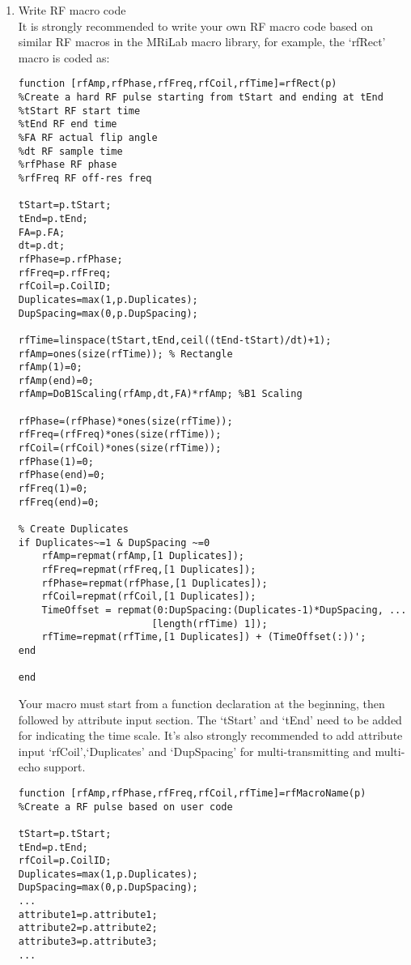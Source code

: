 \documentclass{book}%
\begin{document}
\begin{enumerate}

\item Write RF macro code \\

It is strongly recommended to write your own RF macro code based on similar RF macros in the MRiLab macro library, for example, the `rfRect' macro is coded as:

\begin{verbatim}
function [rfAmp,rfPhase,rfFreq,rfCoil,rfTime]=rfRect(p)
%Create a hard RF pulse starting from tStart and ending at tEnd
%tStart RF start time
%tEnd RF end time
%FA RF actual flip angle
%dt RF sample time
%rfPhase RF phase
%rfFreq RF off-res freq

tStart=p.tStart;
tEnd=p.tEnd;
FA=p.FA;
dt=p.dt;
rfPhase=p.rfPhase;
rfFreq=p.rfFreq;
rfCoil=p.CoilID;
Duplicates=max(1,p.Duplicates);
DupSpacing=max(0,p.DupSpacing);

rfTime=linspace(tStart,tEnd,ceil((tEnd-tStart)/dt)+1);
rfAmp=ones(size(rfTime)); % Rectangle
rfAmp(1)=0;
rfAmp(end)=0;
rfAmp=DoB1Scaling(rfAmp,dt,FA)*rfAmp; %B1 Scaling

rfPhase=(rfPhase)*ones(size(rfTime));
rfFreq=(rfFreq)*ones(size(rfTime));
rfCoil=(rfCoil)*ones(size(rfTime));
rfPhase(1)=0;
rfPhase(end)=0;
rfFreq(1)=0;
rfFreq(end)=0;

% Create Duplicates
if Duplicates~=1 & DupSpacing ~=0
    rfAmp=repmat(rfAmp,[1 Duplicates]);
    rfFreq=repmat(rfFreq,[1 Duplicates]);
    rfPhase=repmat(rfPhase,[1 Duplicates]);
    rfCoil=repmat(rfCoil,[1 Duplicates]);
    TimeOffset = repmat(0:DupSpacing:(Duplicates-1)*DupSpacing, ...
                       [length(rfTime) 1]);
    rfTime=repmat(rfTime,[1 Duplicates]) + (TimeOffset(:))';
end

end
\end{verbatim}

Your macro must start from a function declaration at the beginning, then followed by attribute input section. The `tStart' and `tEnd' need to be added for indicating the time scale. It's also strongly recommended to add attribute input `rfCoil',`Duplicates' and `DupSpacing' for multi-transmitting and multi-echo support.

\begin{verbatim}
function [rfAmp,rfPhase,rfFreq,rfCoil,rfTime]=rfMacroName(p)
%Create a RF pulse based on user code

tStart=p.tStart;
tEnd=p.tEnd;
rfCoil=p.CoilID;
Duplicates=max(1,p.Duplicates);
DupSpacing=max(0,p.DupSpacing);
...
attribute1=p.attribute1;
attribute2=p.attribute2;
attribute3=p.attribute3;
...
\end{verbatim}


\end{enumerate}
\end{document}
